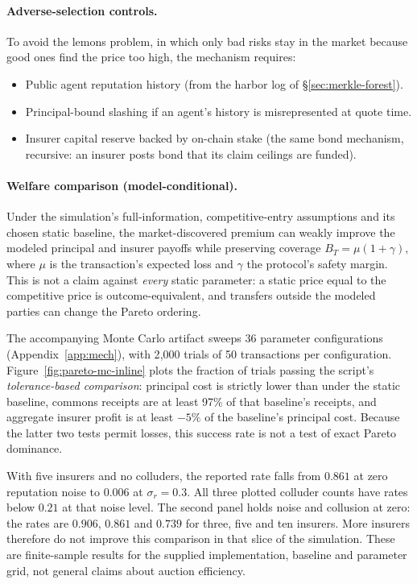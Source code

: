 \documentclass[11pt,a4paper]{article}
\theoremstyle{definition}
\theoremstyle{remark}
\begin{document}
\paragraph{Adverse-selection controls.}
To avoid the lemons problem, in which only bad risks stay in the market because good ones find the price too high, the mechanism requires:
\begin{itemize}[nosep]
  \item Public agent reputation history (from the harbor log of \S\ref{sec:merkle-forest}).
  \item Principal-bound slashing if an agent's history is misrepresented at quote time.
  \item Insurer capital reserve backed by on-chain stake (the same bond mechanism, recursive: an insurer posts bond that its claim ceilings are funded).
\end{itemize}

\paragraph{Welfare comparison (model-conditional).}\label{sec:youle:welfare}
Under the simulation's full-information, competitive-entry assumptions and its chosen static baseline, the market-discovered premium can weakly improve the modeled principal and insurer payoffs while preserving coverage $B_T=\mu(1+\gamma)$, where $\mu$ is the transaction's expected loss and $\gamma$ the protocol's safety margin. This is not a claim against \emph{every} static parameter: a static price equal to the competitive price is outcome-equivalent, and transfers outside the modeled parties can change the Pareto ordering.


The accompanying Monte Carlo artifact sweeps 36 parameter configurations
(Appendix~\ref{app:mech}), with 2{,}000 trials of 50 transactions per
configuration. Figure~\ref{fig:pareto-mc-inline} plots the fraction of trials
passing the script's \emph{tolerance-based comparison}: principal cost is
strictly lower than under the static baseline, commons receipts are at least
97\% of that baseline's receipts, and aggregate insurer profit is at least
$-5\%$ of the baseline's principal cost. Because the latter two tests permit
losses, this success rate is not a test of exact Pareto dominance.

With five insurers and no colluders, the reported rate falls from $0.861$
at zero reputation noise to $0.006$ at $\sigma_r=0.3$. All three plotted
colluder counts have rates below $0.21$ at that noise level. The second
panel holds noise and collusion at zero: the rates are $0.906$, $0.861$ and
$0.739$ for three, five and ten insurers. More insurers therefore do not
improve this comparison in that slice of the simulation. These are
finite-sample results for the supplied implementation, baseline and
parameter grid, not general claims about auction efficiency.
\end{document}
